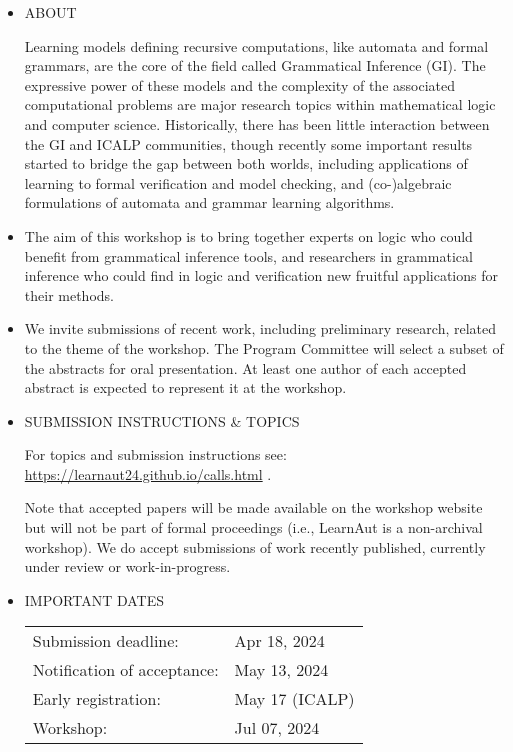 \documentclass[prodmode,acmtecs]{acmsmall} %
\begin{document}
\begin{itemize}\item  ABOUT  
 
  Learning models defining recursive computations, like automata and formal grammars, are the core of the field called Grammatical Inference (GI). The expressive power of these models and the complexity of the associated computational problems are major research topics within mathematical logic and computer science. Historically, there has been little interaction between the GI and ICALP communities, though recently some important results started to bridge the gap between both worlds, including applications of learning to formal verification and model checking, and (co-)algebraic formulations of automata and grammar learning algorithms. 
 
\item  The aim of this workshop is to bring together experts on logic who could benefit from grammatical inference tools, and researchers in grammatical inference who could find in logic and verification new fruitful applications for their methods. 
 
\item  We invite submissions of recent work, including preliminary research, related to the theme of the workshop. The Program Committee will select a subset of the abstracts for oral presentation. At least one author of each accepted abstract is expected to represent it at the workshop. 
 
\item  SUBMISSION INSTRUCTIONS \& TOPICS 
 
  For topics and submission instructions see: \href{https://learnaut24.github.io/calls.html}{https://learnaut24.github.io/calls.html} .  
 
  Note that accepted papers will be made available on the workshop website but will not be part of formal proceedings (i.e., LearnAut is a non-archival workshop). We do accept submissions of work recently published, currently under review or work-in-progress. 
 
\item  IMPORTANT DATES 
 
\begin{tabulary}{\linewidth}{LL}Submission deadline:  & Apr 18, 2024 \\
Notification of acceptance:  & May 13, 2024 \\
Early registration:  & May 17 (ICALP) \\
Workshop:  & Jul 07, 2024 \\
\end{tabulary}
 

\end{itemize}
\end{document}
